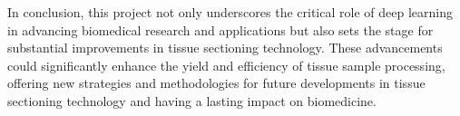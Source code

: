 In conclusion, this project not only underscores the critical role of deep learning in advancing biomedical research and applications but also sets the stage for substantial improvements in tissue sectioning technology. These advancements could significantly enhance the yield and efficiency of tissue sample processing, offering new strategies and methodologies for future developments in tissue sectioning technology and having a lasting impact on biomedicine.


\FloatBarrier %